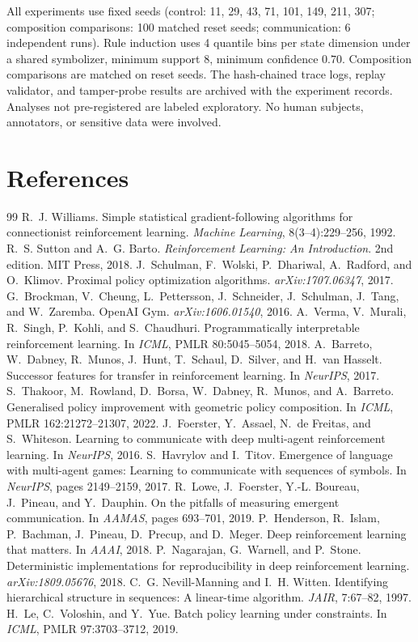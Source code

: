 \documentclass[11pt]{article}
\begin{document}
All experiments use fixed seeds (control: 11, 29, 43, 71, 101, 149, 211, 307; composition comparisons: 100 matched reset seeds; communication: 6 independent runs). Rule induction uses 4 quantile bins per state dimension under a shared symbolizer, minimum support 8, minimum confidence $0.70$. Composition comparisons are matched on reset seeds. The hash-chained trace logs, replay validator, and tamper-probe results are archived with the experiment records. Analyses not pre-registered are labeled exploratory. No human subjects, annotators, or sensitive data were involved.

\section*{References}

\begin{thebibliography}{99}
 R.~J. Williams. Simple statistical gradient-following algorithms for connectionist reinforcement learning. \textit{Machine Learning}, 8(3--4):229--256, 1992.
 R.~S. Sutton and A.~G. Barto. \textit{Reinforcement Learning: An Introduction}. 2nd edition. MIT Press, 2018.
 J.~Schulman, F.~Wolski, P.~Dhariwal, A.~Radford, and O.~Klimov. Proximal policy optimization algorithms. \textit{arXiv:1707.06347}, 2017.
 G.~Brockman, V.~Cheung, L.~Pettersson, J.~Schneider, J.~Schulman, J.~Tang, and W.~Zaremba. OpenAI Gym. \textit{arXiv:1606.01540}, 2016.
 A.~Verma, V.~Murali, R.~Singh, P.~Kohli, and S.~Chaudhuri. Programmatically interpretable reinforcement learning. In \textit{ICML}, PMLR 80:5045--5054, 2018.
 A.~Barreto, W.~Dabney, R.~Munos, J.~Hunt, T.~Schaul, D.~Silver, and H.~van Hasselt. Successor features for transfer in reinforcement learning. In \textit{NeurIPS}, 2017.
 S.~Thakoor, M.~Rowland, D.~Borsa, W.~Dabney, R.~Munos, and A.~Barreto. Generalised policy improvement with geometric policy composition. In \textit{ICML}, PMLR 162:21272--21307, 2022.
 J.~Foerster, Y.~Assael, N.~de Freitas, and S.~Whiteson. Learning to communicate with deep multi-agent reinforcement learning. In \textit{NeurIPS}, 2016.
 S.~Havrylov and I.~Titov. Emergence of language with multi-agent games: Learning to communicate with sequences of symbols. In \textit{NeurIPS}, pages 2149--2159, 2017.
 R.~Lowe, J.~Foerster, Y.-L. Boureau, J.~Pineau, and Y.~Dauphin. On the pitfalls of measuring emergent communication. In \textit{AAMAS}, pages 693--701, 2019.
 P.~Henderson, R.~Islam, P.~Bachman, J.~Pineau, D.~Precup, and D.~Meger. Deep reinforcement learning that matters. In \textit{AAAI}, 2018.
 P.~Nagarajan, G.~Warnell, and P.~Stone. Deterministic implementations for reproducibility in deep reinforcement learning. \textit{arXiv:1809.05676}, 2018.
 C.~G. Nevill-Manning and I.~H. Witten. Identifying hierarchical structure in sequences: A linear-time algorithm. \textit{JAIR}, 7:67--82, 1997.
 H.~Le, C.~Voloshin, and Y.~Yue. Batch policy learning under constraints. In \textit{ICML}, PMLR 97:3703--3712, 2019.
\end{thebibliography}
\end{document}
